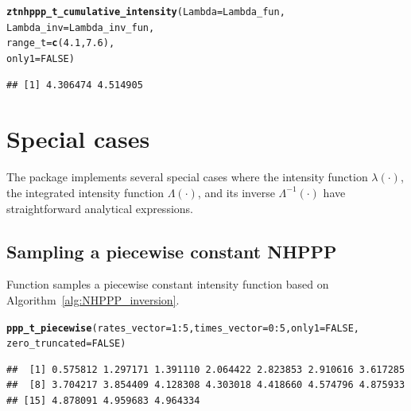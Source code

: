 \documentclass[article,nojss]{jss}\usepackage[]{graphicx}\usepackage[]{xcolor}
\makeatletter
\newcommand{\hlnum}[1]{\textcolor[rgb]{0.686,0.059,0.569}{#1}}%
\newcommand{\hlopt}[1]{\textcolor[rgb]{0,0,0}{#1}}%
\newcommand{\hlstd}[1]{\textcolor[rgb]{0.345,0.345,0.345}{#1}}%
\newcommand{\hlkwc}[1]{\textcolor[rgb]{0.333,0.667,0.333}{#1}}%
\newcommand{\hlkwd}[1]{\textcolor[rgb]{0.737,0.353,0.396}{\textbf{#1}}}%
\newenvironment{kframe}{%
 \def\at@end@of@kframe{}%
 \ifinner\ifhmode%
  \def\at@end@of@kframe{\end{minipage}}%
  \begin{minipage}{\columnwidth}%
 \fi\fi%
 \def\FrameCommand##1{\hskip\@totalleftmargin \hskip-\fboxsep
 \colorbox{shadecolor}{##1}\hskip-\fboxsep
     \hskip-\linewidth \hskip-\@totalleftmargin \hskip\columnwidth}%
 \MakeFramed {\advance\hsize-\width
   \@totalleftmargin\z@ \linewidth\hsize
   \@setminipage}}%
 {\par\unskip\endMakeFramed%
 \at@end@of@kframe}
\newenvironment{knitrout}{}{} %
\newcommand{\fct}[1]{\code{#1()}}
\makeatother
\begin{document}
\begin{knitrout}
\color{fgcolor}\begin{kframe}
\begin{alltt}
\hlkwd{ztnhppp_t_cumulative_intensity}\hlstd{(}\hlkwc{Lambda} \hlstd{= Lambda_fun,}
  \hlkwc{Lambda_inv} \hlstd{= Lambda_inv_fun,}
  \hlkwc{range_t} \hlstd{=} \hlkwd{c}\hlstd{(}\hlnum{4.1}\hlstd{,} \hlnum{7.6}\hlstd{),}
  \hlkwc{only1} \hlstd{=} \hlnum{FALSE}\hlstd{)}
\end{alltt}
\begin{verbatim}
## [1] 4.306474 4.514905
\end{verbatim}
\end{kframe}
\end{knitrout}





\section{Special cases}\label{sec:special_cases}

The  package implements several special cases where the intensity function $\lambda(\cdot)$, the integrated intensity function $\Lambda(\cdot)$, and its inverse $\Lambda^{-1}(\cdot)$ have straightforward analytical expressions.

\subsection{Sampling a piecewise constant NHPPP}\label{sec:sample-nhppp-pc}

Function {\fct{sim\_ppp\_piecewise}} samples a piecewise constant intensity function based on Algorithm~\ref{alg:NHPPP_inversion}.
\begin{knitrout}
\color{fgcolor}\begin{kframe}
\begin{alltt}
\hlkwd{ppp_t_piecewise}\hlstd{(}\hlkwc{rates_vector} \hlstd{=} \hlnum{1}\hlopt{:}\hlnum{5}\hlstd{,} \hlkwc{times_vector} \hlstd{=} \hlnum{0}\hlopt{:}\hlnum{5}\hlstd{,} \hlkwc{only1} \hlstd{=} \hlnum{FALSE}\hlstd{,}
  \hlkwc{zero_truncated} \hlstd{=} \hlnum{FALSE}\hlstd{)}
\end{alltt}
\begin{verbatim}
##  [1] 0.575812 1.297171 1.391110 2.064422 2.823853 2.910616 3.617285
##  [8] 3.704217 3.854409 4.128308 4.303018 4.418660 4.574796 4.875933
## [15] 4.878091 4.959683 4.964334
\end{verbatim}
\end{kframe}
\end{knitrout}
\end{document}
